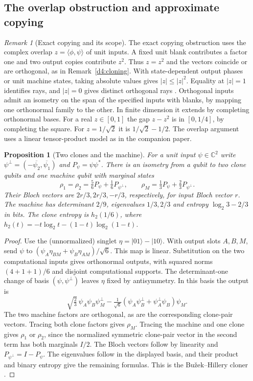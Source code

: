 \documentclass[11pt,reqno]{amsart}
\newtheorem{proposition}[theorem]{Proposition}
\theoremstyle{definition}
\theoremstyle{remark}
\newtheorem{remark}[theorem]{Remark}
\numberwithin{equation}{section}
\newcommand{\C}{\mathbb{C}}
\begin{document}
\subsection{The overlap obstruction and approximate copying}

\begin{remark}[Exact copying and its scope]\label{m7:clone}
The exact copying obstruction uses the complex overlap $z=\langle\phi,\psi\rangle$ of unit inputs. A fixed
unit blank contributes a factor one and two output copies contribute
$z^2$. Thus $z=z^2$ and the vectors coincide or are orthogonal, as in
Remark~\ref{d4:cloning}.
With state-dependent output phases or unit machine states, taking
absolute values gives $|z|\le |z|^2$. Equality at $|z|=1$ identifies
rays, and $|z|=0$ gives distinct orthogonal rays
\cite{d4-wootters,d4-dieks}. Orthogonal inputs admit an isometry on the
span of the specified inputs with blanks, by mapping one
orthonormal family to the other. In finite dimension it extends by
completing orthonormal bases. For a real $z\in[0,1]$ the gap
$z-z^2$ is in $[0,1/4]$, by completing the square.
For $z=1/\sqrt2$ it is $1/\sqrt2-1/2$. The overlap argument
uses a linear tensor-product model as in the companion paper.
\end{remark}

\begin{proposition}[Two clones and the machine]\label{m7:cloning-machine}
For a unit input $\psi\in\C^2$ write
$\psi^\perp=(-\overline{\psi_2},\overline{\psi_1})$ and
$P_\psi=\psi\psi^*$. There is an isometry from a qubit to two
clone qubits and one machine qubit with marginal states
\[
 \rho_1=\rho_2=\tfrac56P_\psi+\tfrac16P_{\psi^\perp},
 \qquad
 \rho_M=\tfrac13P_\psi+\tfrac23P_{\psi^\perp}.
\]
Their Bloch vectors are $2r/3,2r/3,-r/3$, respectively,
for input Bloch vector $r$. The machine has determinant $2/9$,
eigenvalues $1/3,2/3$ and entropy $\log_2 3-2/3$ in bits.
The clone entropy is $h_2(1/6)$, where
$h_2(t)=-t\log_2t-(1-t)\log_2(1-t)$.
\end{proposition}
\begin{proof}
Use the (unnormalized) singlet $\eta=\lvert01\rangle-\lvert10\rangle$.
With output slots $A,B,M$, send $\psi$ to
$(\psi_A\eta_{BM}+\psi_B\eta_{AM})/\sqrt6$.
This map is linear. Substitution on the two computational inputs
gives orthonormal outputs, with squared norms $(4+1+1)/6$ and
disjoint computational supports. The determinant-one change of
basis $(\psi,\psi^\perp)$ leaves $\eta$ fixed by antisymmetry.
In this basis the output is
\[
 \sqrt{\tfrac23}\,\psi_A\psi_B\psi_M^\perp
 -\tfrac1{\sqrt6}(\psi_A\psi_B^\perp+\psi_A^\perp\psi_B)\psi_M .
\]
The two machine factors are orthogonal, as are the corresponding
clone-pair vectors. Tracing both clone factors gives $\rho_M$.
Tracing the machine and one clone gives $\rho_1$ or $\rho_2$,
since the normalized symmetric clone-pair vector in the second
term has both marginals $I/2$. The Bloch vectors follow by
linearity and $P_{\psi^\perp}=I-P_\psi$. The eigenvalues follow in
the displayed basis, and their product and binary entropy give the
remaining formulas. This is the Bu\v{z}ek--Hillery cloner
\cite{m7:BH}.
\end{proof}
\end{document}
